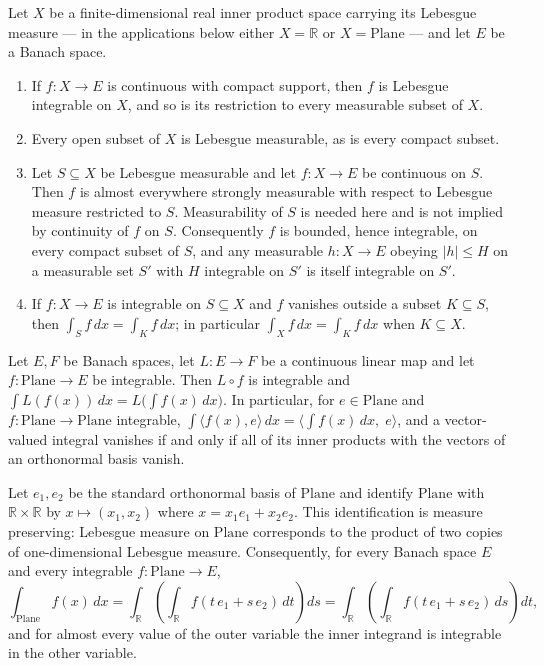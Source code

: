 \begin{proposition}
Let $X$ be a finite-dimensional real inner product space carrying its Lebesgue measure --- in
the applications below either $X=\mathbb{R}$ or $X=\mathrm{Plane}$ --- and let $E$ be a Banach
space.
\begin{enumerate}
\item If $f\colon X\to E$ is continuous with compact support, then $f$ is Lebesgue integrable
on $X$, and so is its restriction to every measurable subset of $X$.
\item Every open subset of $X$ is Lebesgue measurable, as is every compact subset.
\item Let $S\subseteq X$ be Lebesgue measurable and let $f\colon X\to E$ be continuous on $S$.
Then $f$ is almost everywhere strongly measurable with respect to Lebesgue measure restricted
to $S$.  Measurability of $S$ is needed here and is not implied by continuity of $f$ on $S$.
Consequently $f$ is bounded, hence integrable, on every compact subset of $S$, and any
measurable $h\colon X\to E$ obeying $\lvert h\rvert\le H$ on a measurable set $S'$ with $H$
integrable on $S'$ is itself integrable on $S'$.
\item If $f\colon X\to E$ is integrable on $S\subseteq X$ and $f$ vanishes outside a subset
$K\subseteq S$, then $\int_Sf\,dx=\int_Kf\,dx$; in particular $\int_Xf\,dx=\int_Kf\,dx$ when
$K\subseteq X$.
\end{enumerate}
\end{proposition}

\begin{proposition}
Let $E,F$ be Banach spaces, let $L\colon E\to F$ be a continuous linear map and let
$f\colon\mathrm{Plane}\to E$ be integrable.  Then $L\circ f$ is integrable and
$\int L(f(x))\,dx=L\bigl(\int f(x)\,dx\bigr)$.  In particular, for $e\in\mathrm{Plane}$ and
$f\colon\mathrm{Plane}\to\mathrm{Plane}$ integrable,
$\int\langle f(x),e\rangle\,dx=\bigl\langle\int f(x)\,dx,\;e\rangle$, and a vector-valued
integral vanishes if and only if all of its inner products with the vectors of an orthonormal
basis vanish.
\end{proposition}

\begin{proposition}
Let $e_1,e_2$ be the standard orthonormal basis of $\mathrm{Plane}$ and identify
$\mathrm{Plane}$ with $\mathbb{R}\times\mathbb{R}$ by $x\mapsto(x_1,x_2)$ where
$x=x_1e_1+x_2e_2$.  This identification is measure preserving: Lebesgue measure on
$\mathrm{Plane}$ corresponds to the product of two copies of one-dimensional Lebesgue measure.
Consequently, for every Banach space $E$ and every integrable $f\colon\mathrm{Plane}\to E$,
\[
  \int_{\mathrm{Plane}}f(x)\,dx=\int_{\mathbb{R}}\left(\int_{\mathbb{R}}f(t\,e_1+s\,e_2)\,dt\right)ds
  =\int_{\mathbb{R}}\left(\int_{\mathbb{R}}f(t\,e_1+s\,e_2)\,ds\right)dt ,
\]
and for almost every value of the outer variable the inner integrand is integrable in the
other variable.
\end{proposition}

